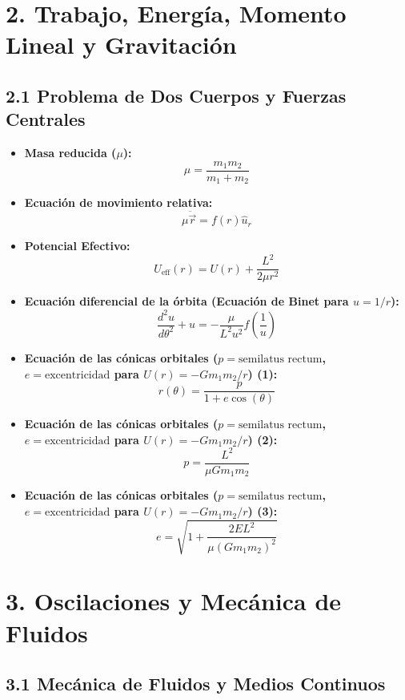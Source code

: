 \documentclass[11pt,a4paper]{article}
\begin{document}
\section*{2. Trabajo, Energía, Momento Lineal y Gravitación}

\subsection*{2.1 Problema de Dos Cuerpos y Fuerzas Centrales}

\begin{itemize}
  \item \textbf{Masa reducida ($\mu$):}
  \[
    \mu = \frac{m_1 m_2}{m_1 + m_2}
  \]
  \item \textbf{Ecuación de movimiento relativa:}
  \[
    \mu \ddot{\vec{r}} = f(r) \hat{u}_r
  \]
  \item \textbf{Potencial Efectivo:}
  \[
    U_{\mathrm{eff}}(r) = U(r) + \frac{L^2}{2\mu r^2}
  \]
  \item \textbf{Ecuación diferencial de la órbita (Ecuación de Binet para $u = 1/r$):}
  \[
    \frac{d^2 u}{d\theta^2} + u = -\frac{\mu}{L^2 u^2} f\left(\frac{1}{u}\right)
  \]
  \item \textbf{Ecuación de las cónicas orbitales ($p = \text{semilatus rectum}$, $e = \text{excentricidad}$ para $U(r) = -G m_1 m_2 / r$) (1):}
  \[
    r(\theta) = \frac{p}{1 + e \cos(\theta)}
  \]
  \item \textbf{Ecuación de las cónicas orbitales ($p = \text{semilatus rectum}$, $e = \text{excentricidad}$ para $U(r) = -G m_1 m_2 / r$) (2):}
  \[
    p = \frac{L^2}{\mu G m_1 m_2}
  \]
  \item \textbf{Ecuación de las cónicas orbitales ($p = \text{semilatus rectum}$, $e = \text{excentricidad}$ para $U(r) = -G m_1 m_2 / r$) (3):}
  \[
    e = \sqrt{1 + \frac{2 E L^2}{\mu (G m_1 m_2)^2}}
  \]
\end{itemize}

\section*{3. Oscilaciones y Mecánica de Fluidos}

\subsection*{3.1 Mecánica de Fluidos y Medios Continuos}
\end{document}
